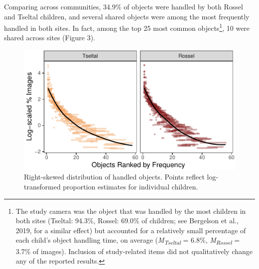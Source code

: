 \documentclass[10pt, letterpaper]{article}
\newenvironment{CodeChunk}{}{}
\begin{document}
Comparing across communities, 34.9\% of objects were handled by both
Rossel and Tseltal children, and several shared objects were among the
most frequently handled in both sites. In fact, among the top 25 most
common objects\footnote{The study camera was the object that was handled
  by the most children in both sites (Tseltal: 94.3\%, Rossel: 69.0\% of
  children; see Bergelson et al., 2019, for a similar effect) but
  accounted for a relatively small percentage of each child's object
  handling time, on average (\emph{M}\textsubscript{\emph{Tseltal}} =
  6.8\%, \emph{M}\textsubscript{\emph{Rossel}} = 3.7\% of images).
  Inclusion of study-related items did not qualitatively change any of
  the reported results.}, 10 were shared across sites (Figure 3).

\begin{CodeChunk}
\begin{figure}[h]

{\centering \includegraphics{figs/zipfian-objects-fig-1} 

}

\caption[Right-skewed distribution of handled objects]{Right-skewed distribution of handled objects. Points reflect log-transformed proportion estimates for individual children.}\label{fig:zipfian-objects-fig}
\end{figure}
\end{CodeChunk}
\end{document}
